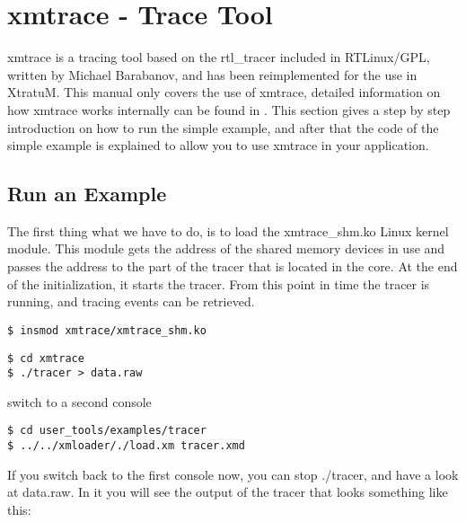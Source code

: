 \section{xmtrace - Trace Tool}

xmtrace is a tracing tool based on the rtl\_tracer included in RTLinux/GPL, written by Michael Barabanov, and has been reimplemented 
for the use in XtratuM. This manual only covers the use of xmtrace, detailed information on how xmtrace works internally can be 
found in \cite{xmtrace}. This section gives a step by step introduction on how to run the simple example, and after that the
code of the simple example is explained to allow you to use xmtrace in your application.\\

\subsection{Run an Example}\label{runex}
The first thing what we have to do, is to load the xmtrace\_shm.ko Linux kernel module. This module gets the address of the shared 
memory devices in use and passes the address to the part of the tracer that is located in the core. At the end of the initialization,
it starts the tracer. From this point in time the tracer is running, and tracing events can be retrieved.

\begin{verbatim}
$ insmod xmtrace/xmtrace_shm.ko
\end{verbatim}


\begin{verbatim}
$ cd xmtrace
$ ./tracer > data.raw
\end{verbatim}

switch to a second console

\begin{verbatim}
$ cd user_tools/examples/tracer
$ ../../xmloader/./load.xm tracer.xmd
\end{verbatim}

If you switch back to the first console now, you can stop ./tracer, and have a look at data.raw. 
In it you will see the output of the tracer that looks something like this:

